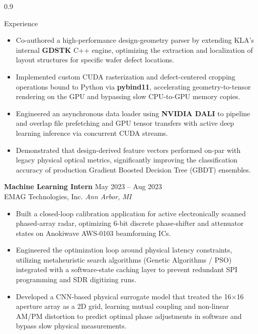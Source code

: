 \documentclass{resume} %
\begin{document}
\begin{spacing}{0.9}
\begin{rSection}{Experience}
\begin{itemize}
  \item Co-authored a high-performance design-geometry parser by extending KLA’s internal \textbf{GDSTK} C++ engine, optimizing the extraction and localization of layout structures for specific wafer defect locations.
 
  \item Implemented custom CUDA rasterization and defect-centered cropping operations bound to Python via \textbf{pybind11}, accelerating geometry-to-tensor rendering on the GPU and bypassing slow CPU-to-GPU memory copies.
 
  \item Engineered an asynchronous data loader using \textbf{NVIDIA DALI} to pipeline and overlap file prefetching and GPU tensor transfers with active deep learning inference via concurrent CUDA streams.
 
  \item Demonstrated that design-derived feature vectors performed on-par with legacy physical optical metrics, significantly improving the classification accuracy of production Gradient Boosted Decision Tree (GBDT) ensembles.
\end{itemize}
\vspace{-0.25em}

\textbf{Machine Learning Intern} \hfill May 2023 -- Aug 2023 \\
EMAG Technologies, Inc. \hfill \textit{Ann Arbor, MI}
\vspace{-0.5em}

\begin{itemize}\itemsep 0pt
  \item Built a closed-loop calibration application for active electronically scanned phased-array radar, optimizing 6-bit discrete phase-shifter and attenuator states on Anokiwave AWS-0103 beamforming ICs.
 
  \item Engineered the optimization loop around physical latency constraints, utilizing metaheuristic search algorithms (Genetic Algorithms / PSO) integrated with a software-state caching layer to prevent redundant SPI programming and SDR digitizing runs.
 
  \item Developed a CNN-based physical surrogate model that treated the 16$\times$16 aperture array as a 2D grid, learning mutual coupling and non-linear AM/PM distortion to predict optimal phase adjustments in software and bypass slow physical measurements.
 

\end{itemize}
\end{rSection}
\end{spacing}
\end{document}
